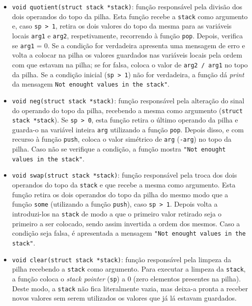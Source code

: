 \documentclass[12pt, a4paper]{article}
\begin{document}
\begin{itemize}
        \item \texttt{void quotient(struct stack *stack)}: função responsável pela divisão dos dois operandos do topo da pilha. Esta função recebe a \texttt{stack} como argumento e, caso \texttt{sp > 1}, retira os dois valores do topo da mesma para as variáveis locais \texttt{arg1} e \texttt{arg2}, respetivamente, recorrendo à função \texttt{pop}. Depois, verifica se \texttt{arg1} = 0. Se a condição for verdadeira apresenta uma mensagem de erro e volta a colocar na pilha os valores guardados nas variáveis locais pela ordem com que estavam na pilha; se for falsa, coloca o valor de \texttt{arg2 / arg1} no topo da pilha. Se a condição inicial (\texttt{sp > 1}) não for verdadeira, a função dá \textit{print} da mensagem \texttt{Not enought values in the stack"}.
        
        \item \texttt{void neg(struct stack *stack)}: função responsável pela alteração do sinal do operando do topo da pilha, recebendo a mesma como argumento (\texttt{struct stack *stack}). Se \texttt{sp > 0}, esta função retira o último operando da pilha e guarda-o na variável inteira \texttt{arg} utilizando a função \texttt{pop}. Depois disso, e com recurso à função \texttt{push}, coloca o valor simétrico de \texttt{arg} (\texttt{-arg}) no topo da pilha. Caso não se verifique a condição, a função mostra \texttt{"Not enought values in the stack"}.
        
        \item \texttt{void swap(struct stack *stack)}: função responsável pela troca dos dois operandos do topo da \texttt{stack} e que recebe a mesma como argumento. Esta função retira os dois operandos do topo da pilha do mesmo modo que a função \texttt{some} (utilizando a função \texttt{push}), caso \texttt{sp > 1}. Depois volta a introduzi-los na \texttt{stack} de modo a que o primeiro valor retirado seja o primeiro a ser colocado, sendo assim invertida a ordem dos mesmos. Caso a condição seja falsa, é apresentada a mensagem \texttt{"Not enought values in the stack"}.
        
        \item \texttt{void clear(struct stack *stack)}: função responsável pela limpeza da pilha recebendo a \texttt{stack} como argumento. Para executar a limpeza da \texttt{stack}, a função coloca o \textit{stack pointer} (\texttt{sp}) a 0 (zero elementos presentes na pilha). Deste modo, a \texttt{stack} não fica literalmente vazia, mas deixa-a pronta a receber novos valores sem serem utilizados os valores que já lá estavam guardados.
        

\end{itemize}
\end{document}
